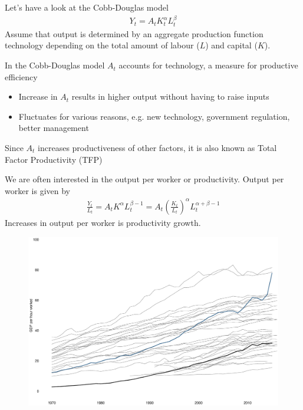\documentclass{beamer}
\begin{document}
\begin{frame}
 Let's have a look at the Cobb-Douglas model  
\begin{align}
  Y_t=A_tK^{\alpha}_tL^{\beta}_t
\end{align}
  \medskip
  Assume that output is determined by an aggregate production function technology depending on the total amount of labour ($L$) and capital ($K$). 
\end{frame}

\begin{frame}
  In the Cobb-Douglas model $A_t$ accounts for technology, a measure for productive efficiency
\begin{itemize}
  \item Increase in $A_t$ results in higher output without having to raise inputs
  \item Fluctuates for various reasons, e.g. new technology, government regulation, better management
\end{itemize} 
\medskip
Since $A_t$ increases productiveness of other factors, it is also known as Total Factor Productivity (TFP)
\end{frame}

\begin{frame}
  We are often interested in the output per worker or productivity.
  Output per worker is given by
  \begin{align}
    \frac{Y_t}{L_t}=A_tK^{\alpha}L^{\beta-1}_t=A_t \left(\frac{K_t}{L_t} \right)^{\alpha}L_t^{\alpha+\beta-1}
  \end{align}
  Increases in output per worker is productivity growth.
\end{frame}

\begin{frame}
  \begin{figure}
    \includegraphics[scale=.3]{productivity.eps}
  \end{figure}
\end{frame}
\end{document}
